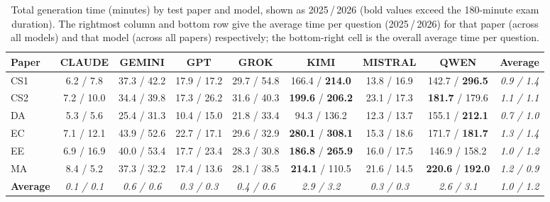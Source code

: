 \begin{table}[htbp]
\centering
\scriptsize
\setlength{\tabcolsep}{4pt}
\begin{tabular}{lccccccc|c}
\toprule
\textbf{Paper} & \textbf{CLAUDE} & \textbf{GEMINI} & \textbf{GPT} & \textbf{GROK} & \textbf{KIMI} & \textbf{MISTRAL} & \textbf{QWEN} & \textbf{Average} \\
\midrule
CS1 & 6.2 / 7.8 & 37.3 / 42.2 & 17.9 / 17.2 & 29.7 / 54.8 & 166.4 / \textbf{214.0} & 13.8 / 16.9 & 142.7 / \textbf{296.5} & \textit{0.9 / 1.4} \\
CS2 & 7.2 / 10.0 & 34.4 / 39.8 & 17.3 / 26.2 & 31.6 / 40.3 & \textbf{199.6} / \textbf{206.2} & 23.1 / 17.3 & \textbf{181.7} / 179.6 & \textit{1.1 / 1.1} \\
DA & 5.3 / 5.6 & 25.4 / 31.3 & 10.4 / 15.0 & 21.8 / 33.4 & 94.3 / 136.2 & 12.3 / 13.7 & 155.1 / \textbf{212.1} & \textit{0.7 / 1.0} \\
EC & 7.1 / 12.1 & 43.9 / 52.6 & 22.7 / 17.1 & 29.6 / 32.9 & \textbf{280.1} / \textbf{308.1} & 15.3 / 18.6 & 171.7 / \textbf{181.7} & \textit{1.3 / 1.4} \\
EE & 6.9 / 16.9 & 40.0 / 53.4 & 17.7 / 23.4 & 28.3 / 30.8 & \textbf{186.8} / \textbf{265.9} & 16.0 / 17.5 & 146.9 / 158.2 & \textit{1.0 / 1.2} \\
MA & 8.4 / 5.2 & 37.3 / 32.2 & 17.4 / 13.6 & 28.1 / 38.5 & \textbf{214.1} / 110.5 & 21.6 / 14.5 & \textbf{220.6} / \textbf{192.0} & \textit{1.2 / 0.9} \\
\midrule
\textbf{Average} & \textit{0.1 / 0.1} & \textit{0.6 / 0.6} & \textit{0.3 / 0.3} & \textit{0.4 / 0.6} & \textit{2.9 / 3.2} & \textit{0.3 / 0.3} & \textit{2.6 / 3.1} & \textit{1.0 / 1.2} \\
\bottomrule
\end{tabular}
\caption{Total generation time (minutes) by test paper and model, shown as 2025\,/\,2026 (bold values exceed the 180-minute exam duration). The rightmost column and bottom row give the average time per question (2025\,/\,2026) for that paper (across all models) and that model (across all papers) respectively; the bottom-right cell is the overall average time per question.}
\label{tab:generation-time}
\end{table}
